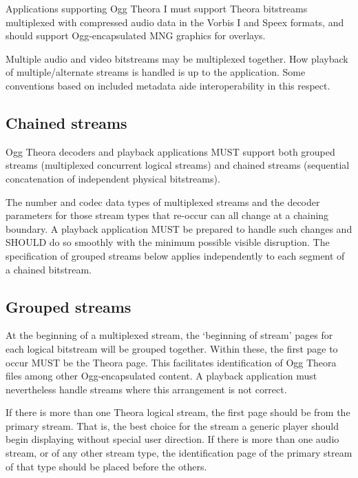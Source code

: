 \documentclass[9pt,letterpaper]{book}
\numberwithin{equation}{chapter}
\numberwithin{figure}{chapter}
\numberwithin{table}{chapter}
\begin{document}
Applications supporting Ogg Theora I must support Theora bitstreams
 multiplexed with compressed audio data in the Vorbis I and Speex
 formats, and should support Ogg-encapsulated MNG graphics for overlays.

Multiple audio and video bitstreams may be multiplexed together.
How playback of multiple/alternate streams is handled is up to the
 application.
Some conventions based on included metadata aide interoperability
 in this respect.

\subsection{Chained streams}

Ogg Theora decoders and playback applications MUST support both grouped
 streams (multiplexed concurrent logical streams) and chained streams
 (sequential concatenation of independent physical bitstreams).

The number and codec data types of multiplexed streams and the decoder
 parameters for those stream types that re-occur can all change at a
 chaining boundary.
A playback application MUST be prepared to handle such changes and
 SHOULD do so smoothly with the minimum possible visible disruption.
The specification of grouped streams below applies independently to each
 segment of a chained bitstream.

\subsection{Grouped streams}

At the beginning of a multiplexed stream, the `beginning of stream'
 pages for each logical bitstream will be grouped together.
Within these, the first page to occur MUST be the Theora page.
This facilitates identification of Ogg Theora files among other
 Ogg-encapsulated content.
A playback application must nevertheless handle streams where this
 arrangement is not correct.

If there is more than one Theora logical stream, the first page should
 be from the primary stream.
That is, the best choice for the stream a generic player should begin
 displaying without special user direction.
If there is more than one audio stream, or of any other stream
 type, the identification page of the primary stream of that type
 should be placed before the others.
\end{document}
